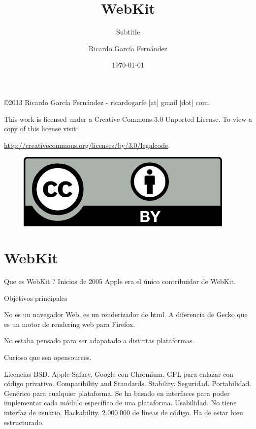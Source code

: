 \documentclass[11pt]{scrartcl}
\title{\textbf{WebKit}}
\subtitle{Subtitle}
\author{Ricardo Garc\'ia Fern\'andez}
\date{\today}
\begin{document}
\maketitle

\vfill

\begin{flushright}
    \copyright  2013 Ricardo Garc\'ia Fern\'andez - ricardogarfe [at] gmail [dot] com.

    This work is licensed under a Creative Commons 3.0 Unported License.
    To view a copy of this license visit:
 
    \url{http://creativecommons.org/licenses/by/3.0/legalcode}.
\end{flushright}

\begin{figure}[h]
    \begin{flushright}	
        \includegraphics{by}
        \label{fig:by}
    \end{flushright}
\end{figure}

\newpage

\section{WebKit}

Que es WebKit ?
Inicios de 2005 Apple era el \'unico contribuidor de WebKit.

Objetivos principales

No es un navegador Web, es un renderizador de html. A diferencia de Gecko que es un motor de rendering web para Firefox.

No estaba pensado para ser adapatado a distintas plataformas.

Curioso que sea opensources.

Licencias BSD. Apple Safary, Google con Chromium.
GPL para enlazar con código privativo.
Compatibility and Standards.
Stability.
Seguridad.
Portabilidad. Genérico para cualquier plataforma. Se ha basado en interfaces para poder implementar cada módulo específico de una plataforma.
Usabilidad. No tiene interfaz de usuario.
Hackability. 2.000.000 de líneas de código. Ha de estar bien estructurado.
\end{document}

